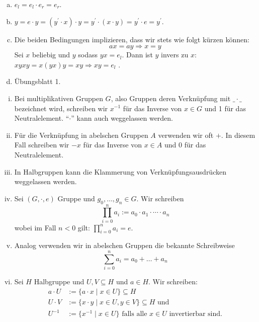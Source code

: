 \begin{beweis}
  \begin{enumerate}[(a)]
  \item \(e_l=e_l\cdot e_r=e_r\).
  \item \(y=e\cdot y=(y^\prime\cdot x) \cdot y=y^\prime\cdot (x \cdot y)=y^\prime\cdot e=y^\prime\).
  \item
    Die beiden Bedingungen implizieren, dass wir stets wie folgt kürzen können:
    \[
      ax=ay \Rightarrow x=y
    \]
    Sei \(x\) beliebig und \(y\) sodass \(yx=e_l\).
    Dann ist \(y\) invers zu \(x\): \(xyxy=x(yx)y=xy \Rightarrow xy=e_l\) .
  \item Übungsblatt 1.
  \end{enumerate}
\end{beweis}

\begin{konvention}
  \begin{enumerate}[(i)]
  \item Bei multiplikativen Gruppen \(G\), also Gruppen deren Verknüpfung mit \(\_\cdot\_\) bezeichnet wird, schreiben wir \(x^{-1}\) für das Inverse von \(x\in G\) und 1 für das Neutralelement. ``\(\cdot\)'' kann auch weggelassen werden.
  \item Für die Verknüpfung in abelschen Gruppen \(A\) verwenden wir oft \(+\).
    In diesem Fall schreiben wir \(-x\) für das Inverse von \(x\in A\) und \(0\) für das Neutralelement.
  \item In Halbgruppen kann die Klammerung von Verknüpfungsausdrücken weggelassen werden.
  \item Sei \((G,\cdot,e)\) Gruppe und \(g_0,\dots,g_n\in G\). Wir schreiben
    \[
    \prod_{i=0}^na_i:= a_0\cdot a_1\cdot \cdots \cdot a_n
    \]
    wobei im Fall \(n<0\) gilt: \(\prod_{i=0}^na_i=e\).
  \item Analog verwenden wir in abelschen Gruppen die bekannte Schreibweise
    \[
      \sum_{i=0}^na_i=a_0+\dots+a_n
    \]
  \item Sei \(H\) Halbgruppe und \(U,V\subseteq H\) und \(a\in H\). Wir schreiben:
    \begin{align*}
      a\cdot U&:=\{a\cdot x\mid x\in U\}\subseteq H \\
      U\cdot V&:=\{x\cdot y\mid x\in U, y\in V\}\subseteq H\text{ und }\\
      U^{-1}&:=\{x^{-1}\mid x\in U\}\text{ falls alle \(x\in U\) invertierbar sind.}
    \end{align*}
  \end{enumerate}
\end{konvention}

